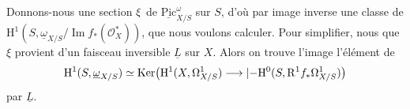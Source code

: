 Donnons-nous une section  $\xi$ de $\underline{\mathrm{Pic}}^{\omega}_{X/S}$ sur $S$, d'où par image inverse une classe de $\mathrm{H}^1(S,\underline{\omega}_{X/S}/\operatorname{Im}f_*(\mathcal{O}_X^*))$, que nous voulons calculer. Pour simplifier, nous   que $\xi$ provient d'un faisceau inversible $\underline{L}$ sur $X$. Alors on trouve l'image  l'élément de
\[
\mathrm{H}^1(S,\underline{\omega}_{X/S})\simeq\operatorname{Ker}\bigl(\mathrm{H}^1(X,\Omega^1_{X/S})\longrightarrow|{-}\mathrm{H}^0(S,\mathrm{R}^1f_*\Omega^1_{X/S})\bigr)
\]
 par $\underline{L}$.

